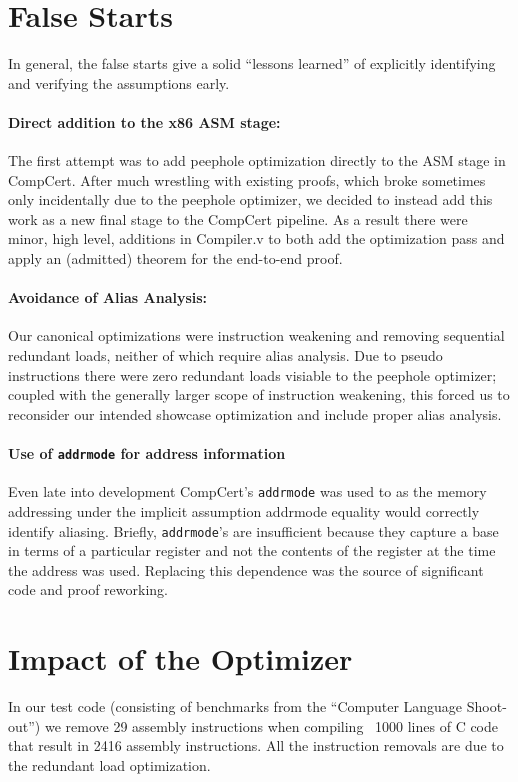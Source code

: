 \documentclass{article}
\begin{document}
\section{False Starts}
In general, the false starts give a solid ``lessons learned'' of
explicitly identifying and verifying the assumptions early.


\paragraph{Direct addition to the x86 ASM stage: }
The first attempt was to add peephole optimization directly to the ASM
stage in CompCert.  After much wrestling with existing proofs, which
broke sometimes only incidentally due to the peephole optimizer, we
decided to instead add this work as a new final stage to the CompCert
pipeline.  As a result there were minor, high level, additions in
Compiler.v to both add the optimization pass and apply an (admitted)
theorem for the end-to-end proof.

\paragraph{Avoidance of Alias Analysis: }
Our canonical optimizations were instruction weakening and removing
sequential redundant loads, neither of which require alias analysis.
Due to pseudo instructions there were zero redundant loads visiable to
the peephole optimizer; coupled with the generally larger scope of
instruction weakening, this forced us to reconsider our intended
showcase optimization and include proper alias analysis.

\paragraph{Use of {\tt addrmode} for address information}
Even late into development CompCert's {\tt addrmode} was used to as the
memory addressing under the implicit assumption addrmode equality would 
correctly identify aliasing.  Briefly, {\tt addrmode}'s are
insufficient because they capture a base in terms of a particular register
and not the contents of the register at the time the address was used.
Replacing this dependence was the source of significant code and proof
reworking.


\section{Impact of the Optimizer}
In our test code (consisting of benchmarks from the ``Computer
Language Shoot-out'') we remove 29 assembly instructions when
compiling ~1000 lines of C code that result in 2416 assembly
instructions.  All the instruction removals are due to the redundant
load optimization. 
\end{document}
